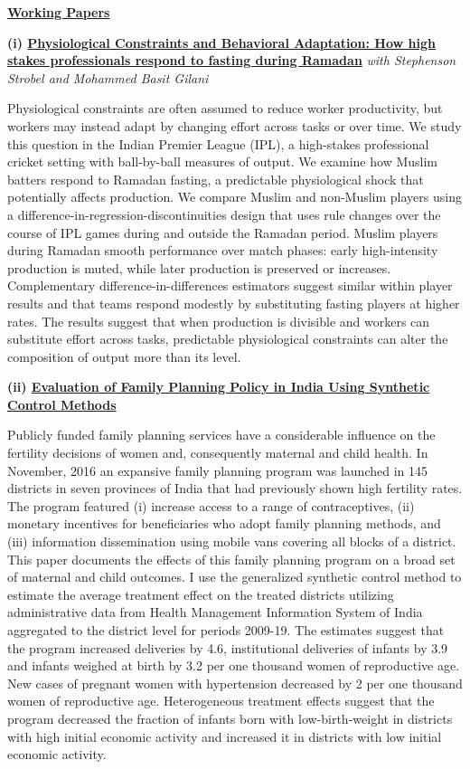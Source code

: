 \documentclass[11pt]{article}
\newcommand{\workingpaper}[5]{%
  \noindent\textbf{(#1) \href{#2}{#3}} \textit{{#4}}\par
  \vspace{2pt}%
  \noindent #5\par
  \vspace{6pt}%
}
\begin{document}
\noindent\textbf{\underline{Working Papers}}\par
\vspace{4pt}%
\workingpaper
  {i}
  {https://kritagyadhanda.site/files/Cricket_Paper.pdf}
  {Physiological Constraints and Behavioral Adaptation: How high stakes professionals respond to fasting during Ramadan}{with Stephenson Strobel and Mohammed Basit Gilani}
  {Physiological constraints are often assumed to reduce worker productivity, but workers may instead adapt by changing effort across tasks or over time. We study this question in the Indian Premier League (IPL), a high-stakes professional cricket setting with ball-by-ball measures of output. We examine how Muslim batters respond to Ramadan fasting, a predictable physiological shock that potentially affects production. We compare Muslim and non-Muslim players using a difference-in-regression-discontinuities design that uses rule changes over the course of IPL games during and outside the Ramadan period. Muslim players during Ramadan smooth performance over match phases: early high-intensity production is muted, while later production is preserved or increases. Complementary difference-in-differences estimators suggest similar within player results and that teams respond modestly by substituting fasting players at higher rates. The results suggest that when production is divisible and workers can substitute effort across tasks, predictable physiological constraints can alter the composition of output more than its level.}

\workingpaper
  {ii}
  {https://kritagyadhanda.site/files/MPV_paper.pdf}
  {Evaluation of Family Planning Policy in India Using Synthetic Control Methods}{}
  {Publicly funded family planning services have a considerable influence on the fertility decisions of women and, consequently maternal and child health. In November, 2016 an expansive family planning program was launched in 145 districts in seven provinces of India that had previously shown high fertility rates. The program featured (i) increase access to a range of contraceptives, (ii) monetary incentives for beneficiaries who adopt family planning methods, and (iii) information dissemination using mobile vans covering all blocks of a district. This paper documents the effects of this family planning program on a broad set of maternal and child outcomes. I use the generalized synthetic control method to estimate the average treatment effect on the treated districts utilizing administrative data from Health Management Information System of India aggregated to the district level for periods 2009-19. The estimates suggest that the program increased deliveries by 4.6, institutional deliveries of infants by 3.9 and infants weighed at birth by 3.2 per one thousand women of reproductive age. New cases of pregnant women with hypertension decreased by 2 per one thousand women of reproductive age. Heterogeneous treatment effects suggest that the program decreased the fraction of infants born with low-birth-weight in districts with high initial economic activity and increased it in districts with low initial economic activity. }
\end{document}
